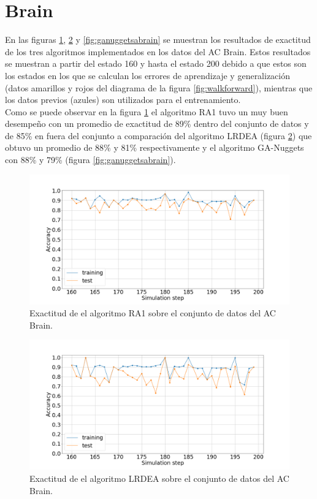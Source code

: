 \section{Brain}
En las figuras \ref{fig:ra1brain}, \ref{fig:lrdeabrain} y \ref{fig:ganuggetsabrain} se muestran los resultados de exactitud de los tres algoritmos implementados en los datos del AC Brain. Estos resultados se muestran a partir del estado 160 y hasta el estado 200 debido a que estos son los estados en los que se calculan los errores de aprendizaje y generalización (datos amarillos y rojos del diagrama de la figura \ref{fig:walkforward}), mientras que los datos previos (azules) son utilizados para el entrenamiento.
\\
Como se puede observar en la figura \ref{fig:ra1brain} el algoritmo RA1 tuvo un muy buen desempeño con un promedio de exactitud de 89\% dentro del conjunto de datos y de 85\% en fuera del conjunto  a comparación del algoritmo LRDEA (figura \ref{fig:lrdeabrain}) que obtuvo un promedio de 88\% y 81\% respectivamente y el algoritmo GA-Nuggets con 88\% y 79\% (figura \ref{fig:ganuggetsabrain}).

	\begin{figure}[H]
		\centering
		\includegraphics[width=\linewidth]{fig/ra1_0}
		\caption{Exactitud de el algoritmo RA1 sobre el conjunto de datos del AC Brain.}
		\label{fig:ra1brain}
	\end{figure}

	\begin{figure}[H]
		\centering
		\includegraphics[width=\linewidth]{fig/LRDEA_1}
		\caption{Exactitud de el algoritmo LRDEA sobre el conjunto de datos del AC Brain.}
		\label{fig:lrdeabrain}
	\end{figure}

